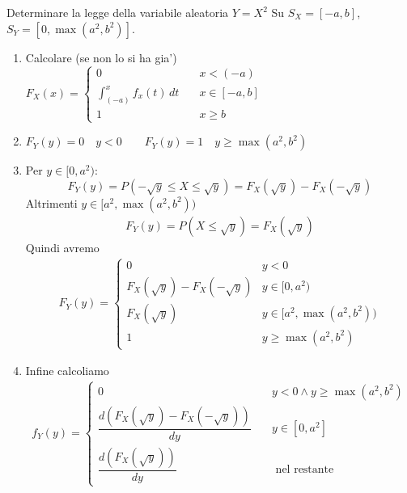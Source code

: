 \documentclass[11pt]{article}
\begin{document}
\begin{concetto}[barGreen]{Determinare la legge della variabile aleatoria $Y=X^2$}
Su $S_X=[-a,b]$, $S_Y=[0,\max(a^2,b^2)]$. 
\begin{enumerate}
\item Calcolare (se non lo si ha gia') $F_X(x) =  \begin{cases}
0 \quad & x < (-a) \\
\int_{(-a)}^x f_x(t) \, dt \quad & x \in [-a,b]\\
1 \quad & x \geq b
  \end{cases}$ 
\item $F_Y(y)=0 \quad y < 0 \qquad F_Y(y)=1 \quad y \geq \max(a^2,b^2)$
\item Per $y\in[0,a^2)$:
\[ F_Y(y)=P(-\sqrt{y}\le X\le\sqrt{y})=F_X(\sqrt{y})-F_X(-\sqrt{y}) \]
Altrimenti $y \in [a^2, \max(a^2,b^2))$
\begin{align*}
  F_Y(y)=P(X\le\sqrt{y})=F_X(\sqrt{y})
\end{align*}
Quindi avremo
\begin{align*}
  F_Y(y)= \begin{cases}
    0 & y < 0\\
    F_X(\sqrt{y})-F_X(-\sqrt{y}) & y\in[0,a^2)\\
    F_X(\sqrt{y}) &y \in [a^2, \max(a^2,b^2))\\
    1 & y \geq \max(a^2,b^2)
  \end{cases}
\end{align*}
\item Infine calcoliamo 
\begin{align*}
  f_Y(y) = \begin{cases}
0 \quad & y < 0 \land y \geq \max(a^2,b^2)\\
    \dfrac{d(F_X(\sqrt{y})-F_X(-\sqrt{y}))}{dy} \quad & y \in [0, a^2]\\
    \dfrac{d(F_X(\sqrt{y}))}{dy} \quad & \text{ nel restante}
\end{cases}
\end{align*}
\end{enumerate}
\end{concetto}
\end{document}
